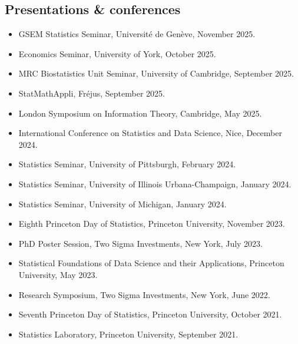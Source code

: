 \documentclass{wgu-cv}
\begin{document}
\subsection{Presentations \& conferences}{}
\begin{itemize}
  \item GSEM Statistics Seminar, Universit{\'e} de Gen{\`e}ve,
    November 2025.
  \item Economics Seminar, University of York,
    October 2025.
  \item MRC Biostatistics Unit Seminar, University of Cambridge,
    September 2025.
  \item StatMathAppli, Fr{\'e}jus,
    September 2025.
  \item London Symposium on Information Theory, Cambridge,
    May 2025.
  \item International Conference on Statistics and Data Science, Nice,
    December 2024.
  \item Statistics Seminar, University of Pittsburgh,
    February 2024.
  \item Statistics Seminar, University of Illinois Urbana-Champaign,
    January 2024.
  \item Statistics Seminar, University of Michigan,
    January 2024.
  \item Eighth Princeton Day of Statistics, Princeton University,
    November 2023.
  \item PhD Poster Session, Two Sigma Investments, New York,
    July 2023.
  \item Statistical Foundations of Data Science and their Applications,
    Princeton University,
    May 2023.
  \item Research Symposium, Two Sigma Investments, New York,
    June 2022.
  \item Seventh Princeton Day of Statistics, Princeton University,
    October 2021.
  \item Statistics Laboratory, Princeton University,
    September 2021.
\end{itemize}
\end{document}
